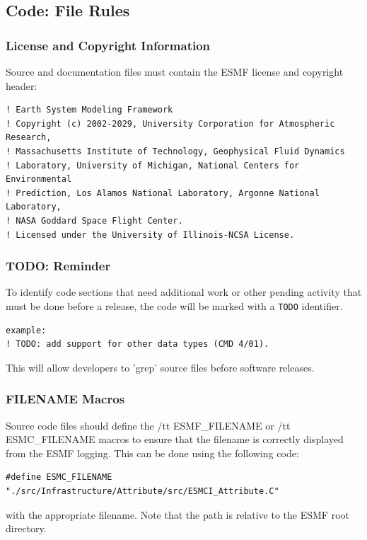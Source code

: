 \subsection{Code: File Rules} 

\subsubsection{License and Copyright Information}

Source and documentation files must contain the ESMF license and 
copyright header:

\begin{verbatim}
! Earth System Modeling Framework
! Copyright (c) 2002-2029, University Corporation for Atmospheric Research,
! Massachusetts Institute of Technology, Geophysical Fluid Dynamics
! Laboratory, University of Michigan, National Centers for Environmental
! Prediction, Los Alamos National Laboratory, Argonne National Laboratory,
! NASA Goddard Space Flight Center.
! Licensed under the University of Illinois-NCSA License.
\end{verbatim}

\subsubsection{TODO: Reminder} 
To identify code sections that need
additional work or other pending activity that must be done before a release,
the code will be marked with a {\tt TODO} identifier. 
\begin{verbatim}
example:
! TODO: add support for other data types (CMD 4/01).
\end{verbatim}
This will allow developers to 'grep' source files before software releases. 

\subsubsection{FILENAME Macros}
Source code files should define the {/tt ESMF\_FILENAME} or {/tt ESMC\_FILENAME}
macros to ensure that the filename is correctly displayed from the ESMF logging.
This can be done using the following code:

\begin{verbatim}
#define ESMC_FILENAME "./src/Infrastructure/Attribute/src/ESMCI_Attribute.C"
\end{verbatim}

with the appropriate filename.  Note that the path is relative to the ESMF
root directory.

